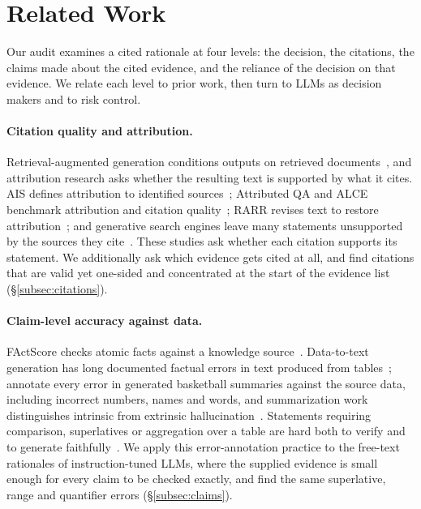 \section{Related Work}
\label{sec:background}
Our audit examines a cited rationale at four levels: the decision, the citations, the claims made about the cited evidence, and the reliance of the decision on that evidence. We relate each level to prior work, then turn to LLMs as decision makers and to risk control.

\paragraph{Citation quality and attribution.}
Retrieval-augmented generation conditions outputs on retrieved documents~\cite{Lewis2020RAG}, and attribution research asks whether the resulting text is supported by what it cites. AIS defines attribution to identified sources~\cite{Rashkin2023AIS}; Attributed QA and ALCE benchmark attribution and citation quality~\cite{Bohnet2022AttributedQA,Gao2023ALCE}; RARR revises text to restore attribution~\cite{Gao2023RARR}; and generative search engines leave many statements unsupported by the sources they cite~\cite{Liu2023Verifiability}. These studies ask whether each citation supports its statement. We additionally ask which evidence gets cited at all, and find citations that are valid yet one-sided and concentrated at the start of the evidence list (\S\ref{subsec:citations}).

\paragraph{Claim-level accuracy against data.}
FActScore checks atomic facts against a knowledge source~\cite{Min2023FActScore}. Data-to-text generation has long documented factual errors in text produced from tables~\cite{Wiseman2017DataToDocument}; \citet{Thomson2020GoldStandard} annotate every error in generated basketball summaries against the source data, including incorrect numbers, names and words, and summarization work distinguishes intrinsic from extrinsic hallucination~\cite{Maynez2020Faithfulness,Ji2023HallucinationSurvey}. Statements requiring comparison, superlatives or aggregation over a table are hard both to verify and to generate faithfully~\cite{Chen2020TabFact,Chen2020LogicNLG}. We apply this error-annotation practice to the free-text rationales of instruction-tuned LLMs, where the supplied evidence is small enough for every claim to be checked exactly, and find the same superlative, range and quantifier errors (\S\ref{subsec:claims}).

